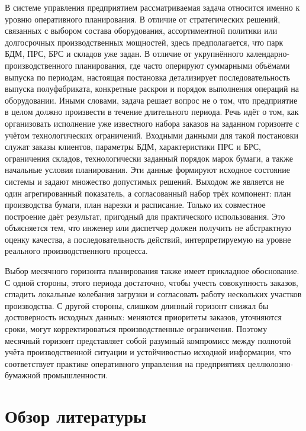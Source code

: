 В системе управления предприятием рассматриваемая задача относится именно к уровню оперативного планирования. В отличие от стратегических решений, связанных с выбором состава оборудования, ассортиментной политики или долгосрочных производственных мощностей, здесь предполагается, что парк БДМ, ПРС, БРС и складов уже задан. В отличие от укрупнённого календарно-производственного планирования, где часто оперируют суммарными объёмами выпуска по периодам, настоящая постановка детализирует последовательность выпуска полуфабриката, конкретные раскрои и порядок выполнения операций на оборудовании. Иными словами, задача решает вопрос не о том, что предприятие в целом должно произвести в течение длительного периода.
Речь идёт о том, как организовать исполнение уже известного набора заказов на заданном горизонте с учётом технологических ограничений.
Входными данными для такой постановки служат заказы клиентов, параметры БДМ, характеристики ПРС и БРС, ограничения складов, технологически заданный порядок марок бумаги, а также начальные условия планирования. Эти данные формируют исходное состояние системы и задают множество допустимых решений. Выходом же является не один агрегированный показатель, а согласованный набор трёх компонент: план производства бумаги, план нарезки и расписание. Только их совместное построение даёт результат, пригодный для практического использования.
Это объясняется тем, что инженер или диспетчер должен получить не абстрактную оценку качества, а последовательность действий, интерпретируемую на уровне реального производственного процесса.


Выбор месячного горизонта планирования также имеет прикладное обоснование. С одной стороны, этого периода достаточно, чтобы учесть совокупность заказов, сгладить локальные колебания загрузки и согласовать работу нескольких участков производства. С другой стороны, слишком длинный горизонт снижал бы достоверность исходных данных: меняются приоритеты заказов, уточняются сроки, могут корректироваться производственные ограничения. Поэтому месячный горизонт представляет собой разумный компромисс между полнотой учёта производственной ситуации и устойчивостью исходной информации, что соответствует практике оперативного управления на предприятиях целлюлозно-бумажной промышленности.


\section{Обзор литературы}\label{sec:theor_ch/literature_review}

